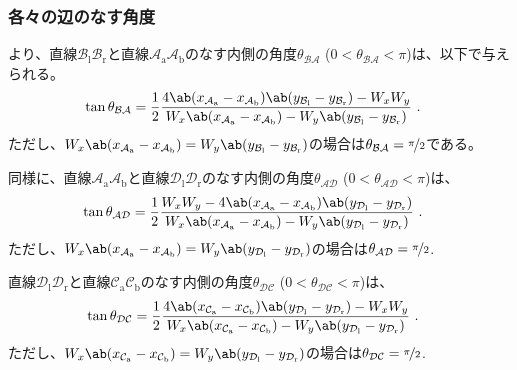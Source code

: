 \clearpage
\subsubsection{各々の辺のなす角度}
より、直線$\mathcal B_\mathrm l\mathcal B_\mathrm r$と直線$\mathcal A_\mathrm a\mathcal A_\mathrm b$のなす内側の角度$\theta_{\mathcal{BA}}$ ($0 < \theta_{\mathcal{BA}} < \pi$)は、以下で与えられる。
\begin{align*}
  \tan\theta_{\mathcal{BA}}
  &= \frac12
     \frac{4\ab(x_{\mathcal A_\mathrm a}-x_{\mathcal A_\mathrm b})
            \ab(y_{\mathcal B_\mathrm l}-y_{\mathcal B_\mathrm r})
           -W_xW_y}
          {W_x\ab(x_{\mathcal A_\mathrm a}-x_{\mathcal A_\mathrm b})
           -W_y\ab(y_{\mathcal B_\mathrm l}-y_{\mathcal B_\mathrm r})}\ .
\end{align*}
ただし、$W_x\ab(x_{\mathcal A_\mathrm a}-x_{\mathcal A_\mathrm b}) = W_y\ab(y_{\mathcal B_\mathrm l}-y_{\mathcal B_\mathrm r})$の場合は$\theta_{\mathcal{BA}} = \nicefrac\pi2$である。

同様に、直線$\mathcal A_\mathrm a\mathcal A_\mathrm b$と直線$\mathcal D_\mathrm l\mathcal D_\mathrm r$のなす内側の角度$\theta_{\mathcal{AD}}$ ($0 < \theta_{\mathcal{AD}} < \pi$)は、
\begin{align*}
  \tan\theta_{\mathcal{AD}}
  &= \frac12
     \frac{W_xW_y
           -4\ab(x_{\mathcal A_\mathrm a}-x_{\mathcal A_\mathrm b})
             \ab(y_{\mathcal D_\mathrm l}-y_{\mathcal D_\mathrm r})}
          {W_x\ab(x_{\mathcal A_\mathrm a}-x_{\mathcal A_\mathrm b})
           -W_y\ab(y_{\mathcal D_\mathrm l}-y_{\mathcal D_\mathrm r})}\ .
\end{align*}
ただし、$W_x\ab(x_{\mathcal A_\mathrm a}-x_{\mathcal A_\mathrm b}) = W_y\ab(y_{\mathcal D_\mathrm l}-y_{\mathcal D_\mathrm r})$の場合は$\theta_{\mathcal{AD}} = \nicefrac\pi2$.

直線$\mathcal D_\mathrm l\mathcal D_\mathrm r$と直線$\mathcal C_\mathrm a\mathcal C_\mathrm b$のなす内側の角度$\theta_{\mathcal{DC}}$ ($0 < \theta_{\mathcal{DC}} < \pi$)は、
\begin{align*}
  \tan\theta_{\mathcal{DC}}
  &= \frac12
     \frac{4\ab(x_{\mathcal C_\mathrm a}-x_{\mathcal C_\mathrm b})
            \ab(y_{\mathcal D_\mathrm l}-y_{\mathcal D_\mathrm r})
           -W_xW_y}
          {W_x\ab(x_{\mathcal C_\mathrm a}-x_{\mathcal C_\mathrm b})
           -W_y\ab(y_{\mathcal D_\mathrm l}-y_{\mathcal D_\mathrm r})}\ .
\end{align*}
ただし、$W_x\ab(x_{\mathcal C_\mathrm a}-x_{\mathcal C_\mathrm b}) = W_y\ab(y_{\mathcal D_\mathrm l}-y_{\mathcal D_\mathrm r})$の場合は$\theta_{\mathcal{DC}} = \nicefrac\pi2$.

